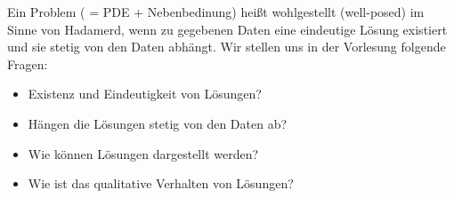 \begin{bemerkung}
	Ein Problem ( = PDE + Nebenbedinung) heißt wohlgestellt (well-posed) im Sinne von Hadamerd, wenn zu gegebenen Daten eine eindeutige Lösung existiert und sie stetig von den Daten abhängt.
	Wir stellen uns in der Vorlesung folgende Fragen:
	\begin{itemize}
		\item Existenz und Eindeutigkeit von Lösungen?
		\item Hängen die Lösungen stetig von den Daten ab?
		\item Wie können Lösungen dargestellt werden?
		\item Wie ist das qualitative Verhalten von Lösungen?
	\end{itemize}
\end{bemerkung}

